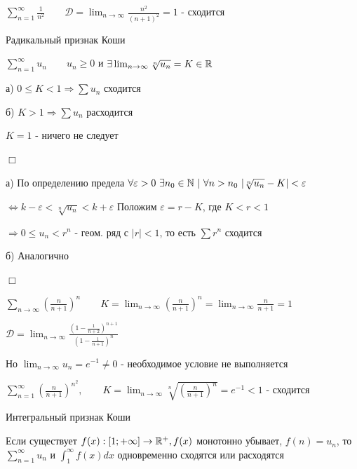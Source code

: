 \documentclass[12pt]{article}
\begin{document}
    $\sum_{n = 1}^\infty \frac{1}{n^2} \quad\quad \mathcal{D} = \lim_{n \to \infty} \frac{n^2}{(n + 1)^2} = 1$ - сходится

    \hypertarget{cauchyradicalsign}{}

    \begin{MyTheorem}
         Радикальный признак Коши

        $\sum_{n = 1}^\infty u_n \quad\quad u_n \geq 0$ и $\exists \lim_{n \to \infty} \sqrt[n]{u_n} = K \in \mathbb{R}$

        а) $0 \leq K < 1 \Longrightarrow \sum u_n$ сходится

        б) $K > 1 \Longrightarrow \sum u_n$ расходится
    \end{MyTheorem}

    \Notas $K = 1$ - ничего не следует

    \begin{MyProof}
        $\Box$

        а) По определению предела $\forall \varepsilon > 0 \ \exists n_0 \in \Natural \ | \ \forall n > n_0 \ |\sqrt[n]{u_n} - K| < \varepsilon$

        $\Longleftrightarrow k - \varepsilon < \sqrt[n]{u_n} < k + \varepsilon$ Положим $\varepsilon = r - K$, где $K < r < 1$

        $\Longrightarrow 0 \leq u_n < r^n$ - геом. ряд с $|r| < 1$, то есть $\sum r^n$ сходится

        б) Аналогично

        $\Box$
    \end{MyProof}

     $\sum_{n \to \infty} \left(\frac{n}{n + 1}\right)^n \quad\quad K = \lim_{n \to \infty} \left(\frac{n}{n + 1}\right)^n = \lim_{n \to \infty} \frac{n}{n + 1} = 1$

    $\mathcal{D} = \lim_{n \to \infty} \frac{\left(1 - \frac{1}{n + 2}\right)^{n + 1}}{\left(1 - \frac{1}{n + 1}\right)^{n}}$

    Но $\lim_{n \to \infty} u_n = e^{-1} \neq 0$ - необходимое условие не выполняется

     $\sum_{n = 1}^\infty \left(\frac{n}{n + 1}\right)^{n^2}, \quad\quad K = \lim_{n \to \infty} \sqrt[n]{\left(\frac{n}{n + 1}\right)^n} = e^{-1} < 1$ - сходится

    \hypertarget{cauchyintegralsign}{}

    \begin{MyTheorem}
         Интегральный признак Коши

        Если существует $f(x) : [1; +\infty] \to \mathbb{R}^+, f(x)$ монотонно убывает, $f(n) = u_n$, то $\sum_{n = 1}^\infty u_n$ и $\int_{1}^\infty f(x) dx$ одновременно сходятся или расходятся
    \end{MyTheorem}
\end{document}
